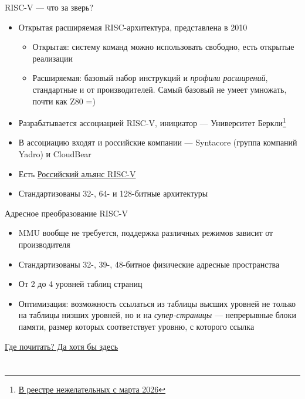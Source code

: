 \documentclass[xetex,aspectratio=43]{beamer}
\begin{document}
\begin{frame}{RISC-V --- что за зверь?}
    \begin{itemize}
        \item Открытая расширяемая RISC-архитектура, представлена в 2010
        \begin{itemize}
            \item Открытая: систему команд можно использовать свободно, есть открытые реализации
            \item Расширяемая: базовый набор инструкций и \emph{профили расширений}, стандартные и от производителей. Самый базовый не умеет умножать, почти как Z80 =)
        \end{itemize}
        \item Разрабатывается ассоциацией RISC-V, инициатор --- Университет Беркли\footnote{
        	\href{https://habr.com/ru/news/1006124/}{В реестре нежелательных с марта 2026}
	}
        \item В ассоциацию входят и российские компании --- Syntacore (группа компаний Yadro) и CloudBear
        \item Есть \href{https://riscv-alliance.ru/}{Российский альянс RISC-V}
        \item Стандартизованы 32-, 64- и 128-битные архитектуры
    \end{itemize}
\end{frame}

\begin{frame}{Адресное преобразование RISC-V}
    \begin{itemize}
        \item MMU вообще не требуется, поддержка различных режимов зависит от производителя
        \item Стандартизованы 32-, 39-, 48-битное физические адресные пространства
        \item От 2 до 4 уровней таблиц страниц
        \item \alert{Оптимизация:} возможность ссылаться из таблицы высших уровней не только на таблицы низших уровней, но и на \emph{супер-страницы} --- непрерывные блоки памяти, размер которых соответствует уровню, с которого ссылка
    \end{itemize}
    \href{https://en.wikipedia.org/wiki/RISC-V\#Privileged_instruction_set}{Где почитать? Да хотя бы здесь}
\end{frame}

\section*{}
\end{document}
